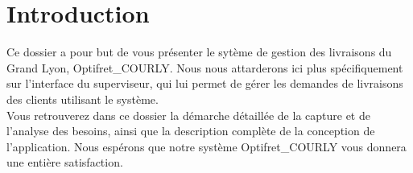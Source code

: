 \chapter*{Introduction}
Ce dossier a pour but de vous présenter le sytème de gestion des livraisons du Grand Lyon, Optifret_COURLY. Nous nous attarderons ici plus spécifiquement sur l'interface du superviseur, qui lui permet de gérer les demandes de livraisons des clients utilisant le système.\\
Vous retrouverez dans ce dossier la démarche détaillée de la capture et de l'analyse des besoins, ainsi que la description complète de la conception de l'application. Nous espérons que notre système Optifret_COURLY vous donnera une entière satisfaction.
